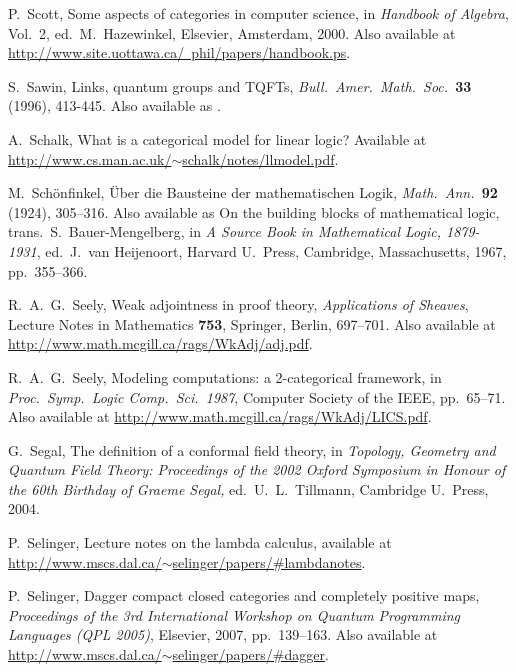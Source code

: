 \documentclass[12pt]{article}
\begin{document}
\begin{thebibliography}{99}
 P.\ Scott, Some aspects of categories in computer science,
in {\sl Handbook of Algebra}, Vol.\ 2, ed.\ M.\ Hazewinkel,
Elsevier, Amsterdam, 2000.
Also available at \hfill \break
\href{http://www.site.uottawa.ca/~phil/papers/handbook.ps}{ http://www.site.uottawa.ca/~phil/papers/handbook.ps}.

 S.\ Sawin, Links, quantum groups and TQFTs,
{\sl Bull.\ Amer.\ Math.\ Soc.\ }{\bf 33} (1996), 413-445. 
Also available as .

 A.\ Schalk, What is a categorical model for linear
logic?  Available at \hfill \break
\href{http://www.cs.man.ac.uk/~schalk/notes/llmodel.pdf}{ http://www.cs.man.ac.uk/$\sim$schalk/notes/llmodel.pdf}.

 M.\ Sch\"onfinkel, \"Uber die Bausteine der 
mathematischen Logik, {\sl Math.\ Ann.\ }{\bf 92} (1924), 305--316. 
Also available as On the building blocks of mathematical logic,
trans.\ S.\ Bauer-Mengelberg, in {\sl A Source Book in Mathematical 
Logic, 1879-1931}, ed.\ J.\ van Heijenoort, Harvard U.\ Press,
Cambridge, Massachusetts, 1967, pp.\ 355--366.

 R.\ A.\ G.\ Seely, Weak adjointness in proof theory,
{\sl Applications of Sheaves}, Lecture Notes in Mathematics {\bf 753},
Springer, Berlin, 697--701.  Also available at \hfill \break
\href{http://www.math.mcgill.ca/rags/WkAdj/adj.pdf}
{http://www.math.mcgill.ca/rags/WkAdj/adj.pdf}.

R.\ A.\ G.\ Seely, Modeling computations: a
2-categorical framework, in {\sl Proc.\ Symp.\ Logic Comp.\ 
Sci.\ 1987}, Computer Society of the IEEE, pp.\ 65--71.
Also available at \hfill \break 
\href{http://www.math.mcgill.ca/rags/WkAdj/LICS.pdf}
{http://www.math.mcgill.ca/rags/WkAdj/LICS.pdf}.

 G.\ Segal, The definition of a conformal field theory, 
in {\sl Topology, Geometry and Quantum Field Theory: Proceedings of the 
2002 Oxford Symposium in Honour of the 60th Birthday of Graeme Segal,} 
ed.\ U.\ L.\ Tillmann, Cambridge U.\ Press, 2004.

 P.\ Selinger, Lecture notes on the lambda calculus,
available at \hfill \break
\href{http://www.mscs.dal.ca/~selinger/papers/#lambdanotes}{ http://www.mscs.dal.ca/$\sim$selinger/papers/\#lambdanotes}.

 P.\ Selinger, Dagger compact closed categories and 
completely positive maps, {\sl Proceedings of the 3rd International Workshop 
on Quantum Programming Languages (QPL 2005)}, Elsevier, 2007, pp.\ 139--163.
Also available at \href{http://www.mscs.dal.ca/~selinger/papers/#dagger}{ http://www.mscs.dal.ca/$\sim$selinger/papers/\#dagger}.


\end{thebibliography}
\end{document}
